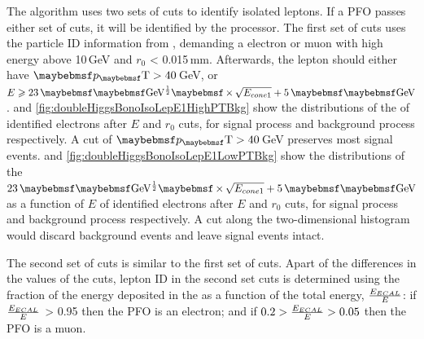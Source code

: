 The algorithm uses two sets of cuts to identify isolated leptons. If a PFO passes either set of cuts, it will be identified by the processor. The first set of cuts uses the particle ID information from \pandora, demanding a \pandora electron or muon with high energy above 10\,GeV and $r_0$ < 0.015\,mm. Afterwards, the lepton should either have $\pT > 40$\,GeV, or $E \geqslant 23\,\uprightMath{GeV^{\frac{1}{2}}} \times \sqrt{E_{cone1}} + 5\,\uprightMath{GeV}$.  and \ref{fig:doubleHiggsBonoIsoLepE1HighPTBkg} show the distributions of the \pT of identified electrons after  $E$  and $r_0$ cuts, for  \eeToHHbbWWHad signal process and \eeTo{ \Pquark \Pquark \Pquark \Pquark \Plepton \Pnu}  background process respectively. A cut of $\pT > 40$\,GeV preserves most signal events.  and \ref{fig:doubleHiggsBonoIsoLepE1LowPTBkg} show the distributions of the $23\,\uprightMath{GeV^{\frac{1}{2}}} \times \sqrt{E_{cone1}} + 5\,\uprightMath{GeV}$ as a function of $E$ of identified electrons after  $E$  and $r_0$ cuts, for  \eeToHHbbWWHad signal process and \eeTo{ \Pquark \Pquark \Pquark \Pquark \Plepton \Pnu}  background process respectively. A cut along the two-dimensional histogram would discard background events and leave signal events intact.


The second set of cuts is similar to the first set of cuts. Apart of the differences in the values of the cuts, lepton ID in the second set cuts is determined using the fraction of the energy deposited in the \ECAL as a function of the total energy,  $\frac{E_{ECAL}}{E}$: if $\frac{E_{ECAL}}{E}$  > 0.95 then the PFO is an electron; and if  $0.2 > \frac{E_{ECAL}}{E} > 0.05$  then the PFO is a muon.





